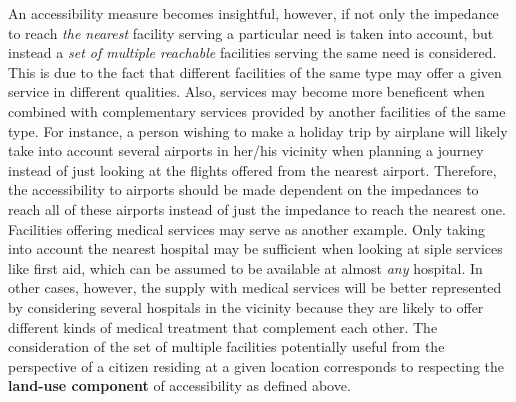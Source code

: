 
An accessibility measure becomes insightful, however, if not only the impedance to reach \textit{the nearest} facility 
serving a particular need is taken into account, but instead a \textit{set of multiple reachable} facilities serving the same 
need is considered. This is due to the fact that different facilities of the same type may offer a given service in 
different qualities. Also, services may become more beneficent when combined with complementary services provided by 
another facilities of the same type. For instance, a person wishing to make a holiday trip by airplane will likely 
take into account several airports in her/his vicinity when planning a journey instead of just looking at the flights 
offered from the nearest airport. Therefore, the accessibility to airports should be made dependent on the impedances 
to reach all of these airports instead of just the impedance to reach the nearest one. Facilities offering medical 
services may serve as another example. Only taking into account the nearest hospital may be sufficient when looking 
at siple services like first aid, which can be assumed to be available at almost \textit{any} hospital. In other cases, 
however, the supply with medical services will be better represented by considering several hospitals in the vicinity 
because they are likely to offer different kinds of medical treatment that complement each other. 
The consideration of the set of multiple facilities potentially useful from the perspective of a citizen residing
at a given location corresponds to respecting the \textbf{land-use component} of accessibility as defined above.


